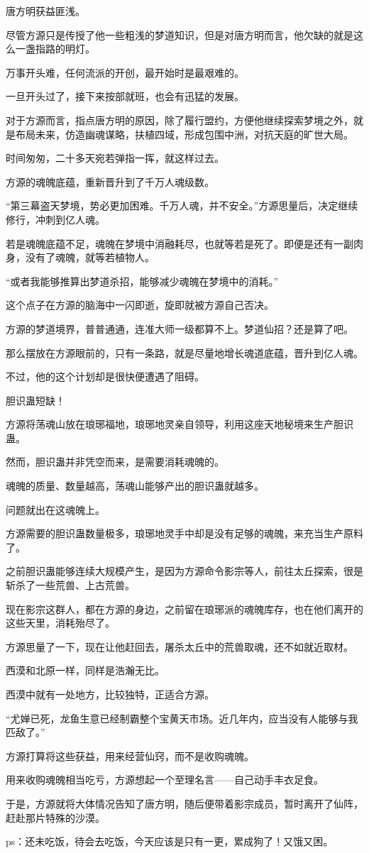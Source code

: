 \begin{this_body}
唐方明获益匪浅。

尽管方源只是传授了他一些粗浅的梦道知识，但是对唐方明而言，他欠缺的就是这么一盏指路的明灯。

万事开头难，任何流派的开创，最开始时是最艰难的。

一旦开头过了，接下来按部就班，也会有迅猛的发展。

对于方源而言，指点唐方明的原因，除了履行盟约，方便他继续探索梦境之外，就是布局未来，仿造幽魂谋略，扶植四域，形成包围中洲，对抗天庭的旷世大局。

时间匆匆，二十多天宛若弹指一挥，就这样过去。

方源的魂魄底蕴，重新晋升到了千万人魂级数。

“第三幕盗天梦境，势必更加困难。千万人魂，并不安全。”方源思量后，决定继续修行，冲刺到亿人魂。

若是魂魄底蕴不足，魂魄在梦境中消融耗尽，也就等若是死了。即便是还有一副肉身，没有了魂魄，就等若植物人。

“或者我能够推算出梦道杀招，能够减少魂魄在梦境中的消耗。”

这个点子在方源的脑海中一闪即逝，旋即就被方源自己否决。

方源的梦道境界，普普通通，连准大师一级都算不上。梦道仙招？还是算了吧。

那么摆放在方源眼前的，只有一条路，就是尽量地增长魂道底蕴，晋升到亿人魂。

不过，他的这个计划却是很快便遭遇了阻碍。

胆识蛊短缺！

方源将荡魂山放在琅琊福地，琅琊地灵亲自领导，利用这座天地秘境来生产胆识蛊。

然而，胆识蛊并非凭空而来，是需要消耗魂魄的。

魂魄的质量、数量越高，荡魂山能够产出的胆识蛊就越多。

问题就出在这魂魄上。

方源需要的胆识蛊数量极多，琅琊地灵手中却是没有足够的魂魄，来充当生产原料了。

之前胆识蛊能够连续大规模产生，是因为方源命令影宗等人，前往太丘探索，很是斩杀了一些荒兽、上古荒兽。

现在影宗这群人，都在方源的身边，之前留在琅琊派的魂魄库存，也在他们离开的这些天里，消耗殆尽了。

方源思量了一下，现在让他赶回去，屠杀太丘中的荒兽取魂，还不如就近取材。

西漠和北原一样，同样是浩瀚无比。

西漠中就有一处地方，比较独特，正适合方源。

“尤婵已死，龙鱼生意已经制霸整个宝黄天市场。近几年内，应当没有人能够与我匹敌了。”

方源打算将这些获益，用来经营仙窍，而不是收购魂魄。

用来收购魂魄相当吃亏，方源想起一个至理名言——自己动手丰衣足食。

于是，方源就将大体情况告知了唐方明，随后便带着影宗成员，暂时离开了仙阵，赶赴那片特殊的沙漠。

ps：还未吃饭，待会去吃饭，今天应该是只有一更，累成狗了！又饿又困。

\end{this_body}


